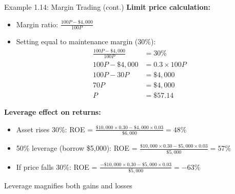 \documentclass[10pt,handout]{beamer}
\begin{document}
\begin{frame}{Example 1.14: Margin Trading (cont.)}
  \textbf{Limit price calculation:}
  \begin{itemize}
    \item Margin ratio: $\tfrac{100P - \$4,000}{100P}$
    \item Setting equal to maintenance margin (30\%):
    \begin{align*}
      \tfrac{100P - \$4,000}{100P} &= 30\%\\
      100P - \$4,000 &= 0.3 \times 100P\\
      100P - 30P &= \$4,000\\
      70P &= \$4,000\\
      P &= \$57.14
    \end{align*}
  \end{itemize}
  
  \pause
  \textbf{Leverage effect on returns:}
  \begin{itemize}
    \item Asset rises 30\%: ROE = $\tfrac{\$10,000 \times 0.30 - \$4,000 \times 0.03}{\$6,000} = 48\%$
    \item 50\% leverage (borrow \$5,000): ROE = $\tfrac{\$10,000 \times 0.30 - \$5,000 \times 0.03}{\$5,000} = 57\%$
    \item If price falls 30\%: ROE = $\tfrac{-\$10,000 \times 0.30 - \$5,000 \times 0.03}{\$5,000} = -63\%$
  \end{itemize}
  
  \pause
  Leverage magnifies both gains and losses
\end{frame}
\end{document}
